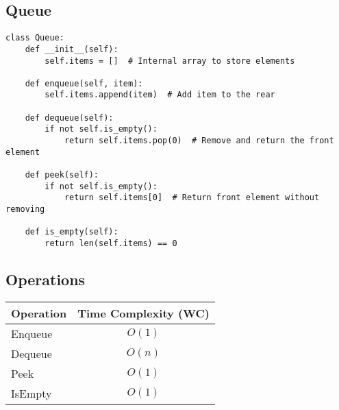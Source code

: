 \subsection{Queue}
\begin{algo}
\begin{lstlisting}
class Queue:
    def __init__(self):
        self.items = []  # Internal array to store elements

    def enqueue(self, item):
        self.items.append(item)  # Add item to the rear

    def dequeue(self):
        if not self.is_empty():
            return self.items.pop(0)  # Remove and return the front element

    def peek(self):
        if not self.is_empty():
            return self.items[0]  # Return front element without removing

    def is_empty(self):
        return len(self.items) == 0
\end{lstlisting}
\end{algo}

\subsection{Operations}
\begin{summary}
    \begin{center}
        \begin{tabular}{lc}
            \toprule
            \textbf{Operation} & \textbf{Time Complexity (WC)} \\
            \midrule
            Enqueue  & $O(1)$ \\
            Dequeue  & $O(n)$ \\
            Peek     & $O(1)$ \\
            IsEmpty  & $O(1)$ \\
            \bottomrule
        \end{tabular}
    \end{center}
\end{summary}
